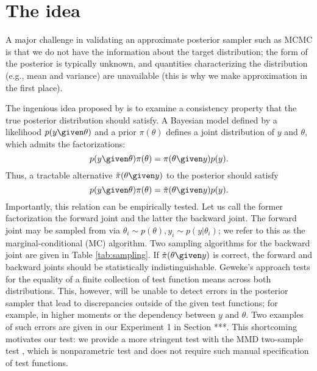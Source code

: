 \section{The idea}
A major challenge in validating an approximate posterior sampler such as MCMC is that we do not have the information about the target distribution; 
the form of the posterior is typically unknown, and quantities characterizing the distribution (e.g., mean and variance) are unavailable (this is why we make approximation in the first place).

The ingenious idea proposed by \cite{geweke_getting_2004} is to examine a consistency property that the true posterior distribution should satisfy. 
A Bayesian model defined by a likelihood $p(y\given \theta)$ and a prior $\pi(\theta)$ defines a joint distribution of $y$ and $\theta$, which admits the factorizations: 
\[p(y\given \theta) \pi(\theta) = \pi(\theta\given y) p(y).\]
Thus, a tractable alternative $\tilde{\pi}(\theta\given y)$ to the posterior should satisfy 
\[p(y\given \theta) \pi(\theta) = \tilde{\pi}(\theta\given y) p(y).\]
Importantly, this relation can be empirically tested.
Let us call the former factorization the forward joint and the latter the backward joint. The forward joint may be sampled from via $\theta_{i} \sim p(\theta), y_{i} \sim p(y|\theta_{i})$; we refer to this as the marginal-conditional (MC) algorithm. Two sampling algorithms for the backward joint are given in Table \ref{tab:sampling}. If $\tilde{\pi}(\theta\given y)$ is correct, the forward and backward joints should be statistically indistinguishable. Geweke's approach tests for the equality of a finite collection of test function means across both distributions. This, however, will be unable to detect errors in the posterior sampler that lead to discrepancies outside of the given test functions; for example, in higher moments or the dependency between $y$ and $\theta$. Two examples of such errors are given in our Experiment 1 in Section ***.
This shortcoming motivates our test: we provide a more stringent test with the MMD two-sample test \citep{gretton_kernel_2012}, which is nonparametric test and does not require such manual specification of test functions. 


